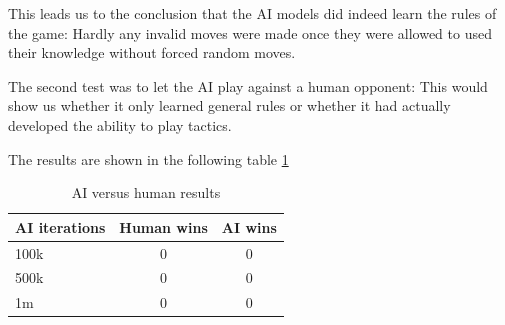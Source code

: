 This leads us to the conclusion that the \ac{AI} models did indeed learn the rules of the game: Hardly any invalid moves were made once they were allowed to used their knowledge without forced random moves.


The second test was to let the \ac{AI} play against a human opponent: This would show us whether it only learned general rules or whether it had actually developed the ability to play tactics.

The results are shown in the following table \ref{aiGameResults}

\begin{table}[H]
	\begin{tabular}{|l|c|c|}\hline
		AI iterations & Human wins & AI wins \\ \hline \hline
		100k & 0 & 0 \\ \hline
		500k & 0 & 0 \\ \hline
		1m & 0 & 0 \\ \hline
	\end{tabular}
	\caption{AI versus human results}
	\label{aiGameResults}
\end{table}